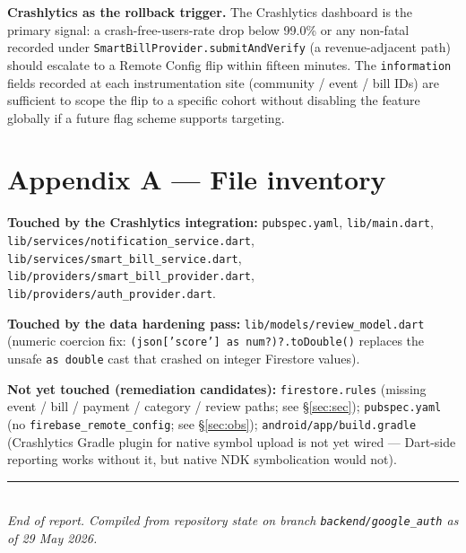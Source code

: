\documentclass[11pt,a4paper]{article}
\begin{document}
\textbf{Crashlytics as the rollback trigger.} The Crashlytics dashboard is
the primary signal: a crash-free-users-rate drop below 99.0\% or any
non-fatal recorded under \texttt{SmartBillProvider.submitAndVerify} (a
revenue-adjacent path) should escalate to a Remote Config flip within
fifteen minutes. The \texttt{information} fields recorded at each
instrumentation site (community / event / bill IDs) are sufficient to
scope the flip to a specific cohort without disabling the feature
globally if a future flag scheme supports targeting.

\section*{Appendix A --- File inventory}

\noindent\textbf{Touched by the Crashlytics integration:} \texttt{pubspec.yaml},
\texttt{lib/main.dart}, \texttt{lib/services/notification\_service.dart},
\texttt{lib/services/smart\_bill\_service.dart},
\texttt{lib/providers/smart\_bill\_provider.dart},
\texttt{lib/providers/auth\_provider.dart}.

\noindent\textbf{Touched by the data hardening pass:}
\texttt{lib/models/review\_model.dart} (numeric coercion fix:
\texttt{(json['score'] as num?)?.toDouble()} replaces the unsafe
\texttt{as double} cast that crashed on integer Firestore values).

\noindent\textbf{Not yet touched (remediation candidates):}
\texttt{firestore.rules} (missing event / bill / payment / category /
review paths; see \S\ref{sec:sec}); \texttt{pubspec.yaml} (no
\texttt{firebase\_remote\_config}; see \S\ref{sec:obs});
\texttt{android/app/build.gradle} (Crashlytics Gradle plugin for native
symbol upload is not yet wired --- Dart-side reporting works without it,
but native NDK symbolication would not).

\vspace{0.6em}\noindent\rule{\linewidth}{0.3pt}\\
\small \emph{End of report. Compiled from repository state on
branch \texttt{backend/google\_auth} as of 29 May 2026.}
\end{document}
